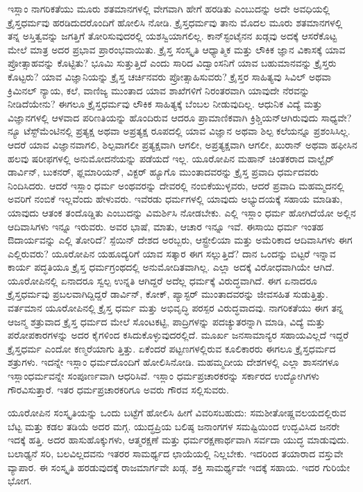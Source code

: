 ಇಸ್ಲಾಂ ನಾಗರಿಕತೆಯು ಮೂರು ಶತಮಾನಗಳಲ್ಲಿ ವೇಗವಾಗಿ ಹೇಗೆ ಹರಡಿತು ಎಂಬುದನ್ನು ಅದೇ ಅವಧಿಯಲ್ಲಿ ಕ್ರೈಸ್ತಧರ್ಮವು ಹರಡಿದುದರೊಂದಿಗೆ ಹೋಲಿಸಿ ನೋಡಿ. ಕ್ರೈಸ್ತಧರ್ಮವು ತಾನು ಮೊದಲ ಮೂರು ಶತಮಾನಗಳಲ್ಲಿ ತನ್ನ ಅಸ್ತಿತ್ವವನ್ನು ಜಗತ್ತಿಗೆ ತೋರಿಸುವುದರಲ್ಲಿ ಯಶಸ್ವಿಯಾಗಲಿಲ್ಲ. ಕಾನ್​ಸ್ಟಂಟೈನನ ಖಡ್ಗವು ಅದಕ್ಕೆ ಆಸರೆಕೊಟ್ಟ ಮೇಲೆ ಮಾತ್ರ ಅದರ ಪ್ರಭಾವ ಪ್ರಾರಂಭವಾಯಿತು. ಕ್ರೈಸ್ತ ಸಂಸ್ಕೃತಿ ಆಧ್ಯಾತ್ಮಿಕ ಮತ್ತು ಲೌಕಿಕ ಜ್ಞಾನ ವಿಕಾಸಕ್ಕೆ ಯಾವ ಪ್ರೋತ್ಸಾಹವನ್ನು ಕೊಟ್ಟಿತು? ಭೂಮಿ ಸುತ್ತುತ್ತಿದೆ ಎಂದು ಸಾರಿದ ವಿದ್ವಾಂಸನಿಗೆ ಯಾವ ಬಹುಮಾನವನ್ನು ಕ್ರೈಸ್ತರು ಕೊಟ್ಟರು? ಯಾವ ವಿಜ್ಞಾನಿಯನ್ನು ಕ್ರೈಸ್ತ ಚರ್ಚಿನವರು ಪ್ರೋತ್ಸಾಹಿಸುವರು? ಕ್ರೈಸ್ತರ ಸಾಹಿತ್ಯವು ಸಿವಿಲ್​ ಅಥವಾ ಕ್ರಿಮಿನಲ್​ ನ್ಯಾಯ, ಕಲೆ, ವಾಣಿಜ್ಯ ಮುಂತಾದ ಯಾವ ಶಾಖೆಗಳಿಗೆ ನಿರಂತರವಾಗಿ ಯಾವುದೇ ನೆರವನ್ನು ನೀಡಿದೆಯೇನು? ಈಗಲೂ ಕ್ರೈಸ್ತಧರ್ಮವು ಲೌಕಿಕ ಸಾಹಿತ್ಯಕ್ಕೆ ಬೆಂಬಲ ನೀಡುವುದಿಲ್ಲ. ಆಧುನಿಕ ವಿದ್ಯೆ ಮತ್ತು ವಿಜ್ಞಾನಗಳಲ್ಲಿ ಆಳವಾದ ಪರಿಣತಿಯನ್ನು ಹೊಂದಿರುವ ಆದರೂ ಪ್ರಾಮಾಣಿಕವಾಗಿ ಕ್ರಿಶ್ಚಿಯನ್​ ಆಗಿರುವುದು ಸಾಧ್ಯವೇ? ನ್ಯೂ ಟೆಸ್ಟ್​ಮೆಂಟಿನಲ್ಲಿ ಪ್ರತ್ಯಕ್ಷ ಅಥವಾ ಅಪ್ರತ್ಯಕ್ಷ ರೂಪದಲ್ಲಿ ಯಾವ ವಿಜ್ಞಾನ ಅಥವಾ ಶಿಲ್ಪ ಕಲೆಯನ್ನೂ ಪ್ರಶಂಸಿಸಿಲ್ಲ. ಆದರೆ ಯಾವ ವಿಜ್ಞಾನವಾಗಲಿ, ಶಿಲ್ಪವಾಗಲೀ ಪ್ರತ್ಯಕ್ಷವಾಗಿ ಆಗಲೀ, ಅಪ್ರತ್ಯಕ್ಷವಾಗಿ ಆಗಲೀ, ಖುರಾನ್​ ಅಥವಾ ಹಫೀಸಿನ ಹಲವು ಷರೀಫಗಳಲ್ಲಿ ಅನುಮೋದನೆಯನ್ನು ಪಡೆಯದೆ ಇಲ್ಲ. ಯೂರೋಪಿನ ಮಹಾನ್​ ಚಿಂತಕರಾದ ವಾಲ್ಟೈರ್​ ಡಾರ್ವಿನ್​, ಬುಕನರ್​, ಫ್ಲಮಾರಿಯನ್​, ವಿಕ್ಟರ್​ ಹ್ಯೂಗೊ ಮುಂತಾದವರನ್ನು ಕ್ರೈಸ್ತ ಪ್ರವಾದಿ ಧರ್ಮದವರು ನಿಂದಿಸಿದರು. ಆದರೆ ಇಸ್ಲಾಂ ಧರ್ಮ ಅಂಥವರನ್ನು ದೇವರಲ್ಲಿ ನಂಬಿಕೆಯುಳ್ಳವರು, ಆದರೆ ಪ್ರವಾದಿ ಮಹಮ್ಮದನಲ್ಲಿ ಅವರಿಗೆ ನಂಬಿಕೆ ಇಲ್ಲವೆಂದು ಹೇಳುವರು. ಇವೆರಡು ಧರ್ಮಗಳಲ್ಲಿ ಯಾವುದು ಅಭ್ಯುದಯಕ್ಕೆ ಸಹಾಯ ಮಾಡಿತು, ಯಾವುದು ಆತಂಕ ತಂದೊಡ್ಡಿತು ಎಂಬುದನ್ನು ವಿಮರ್ಶಿಸಿ ನೋಡಬೇಕು. ಎಲ್ಲಿ ಇಸ್ಲಾಂ ಧರ್ಮ ಹೋಗಿದೆಯೋ ಅಲ್ಲಿನ ಆದಿವಾಸಿಗಳು ಇನ್ನೂ ಇರುವರು. ಅವರ ಭಾಷೆ, ಮಾತು, ಆಚಾರ ಇನ್ನೂ ಇವೆ. ಈಸಾಯಿ ಧರ್ಮ ಇಂತಹ ಔದಾರ್ಯವನ್ನು ಎಲ್ಲಿ ತೋರಿದೆ? ಸ್ಪೆಯಿನ್​ ದೇಶದ ಅರಬ್ಬರು, ಆಸ್ಟ್ರೇಲಿಯಾ ಮತ್ತು ಅಮೆರಿಕಾದ ಆದಿವಾಸಿಗಳು ಈಗ ಎಲ್ಲಿರುವರು? ಯೂರೋಪಿನ ಯಹೂದ್ಯರಿಗೆ ಯಾವ ಸತ್ಕಾರ ಈಗ ಸಲ್ಲುತ್ತಿದೆ? ದಾನ ಒಂದನ್ನು ಬಿಟ್ಟರೆ ಇನ್ನಾವ ಕಾರ್ಯ ಪದ್ಧತಿಯೂ ಕ್ರೈಸ್ತ ಧರ್ಮಗ್ರಂಥದಲ್ಲಿ ಅನುಮೋದಿತವಾಗಿಲ್ಲ. ಎಲ್ಲಾ ಅದಕ್ಕೆ ವಿರೋಧವಾಗಿಯೇ ಆಗಿದೆ. ಯೂರೋಪಿನಲ್ಲಿ ಏನಾದರೂ ಸ್ವಲ್ಪ ಉನ್ನತಿ ಆಗಿದ್ದರೆ ಅದೆಲ್ಲ ಧರ್ಮಕ್ಕೆ ವಿರುದ್ಧವಾಗಿದೆ. ಈಗ ಏನಾದರೂ ಕ್ರೈಸ್ತಧರ್ಮವು ಪ್ರಬಲವಾಗಿದ್ದಿದ್ದರೆ ಡಾರ್ವಿನ್​, ಕೋಕ್​, ಪ್ಯಾಸ್ಟರ್​ ಮುಂತಾದವರನ್ನು ಜೀವಸಹಿತ ಸುಡುತ್ತಿತ್ತು. ವರ್ತಮಾನ ಯೂರೋಪಿನಲ್ಲಿ ಕ್ರೈಸ್ತ ಧರ್ಮ ಮತ್ತು ಅಭಿವೃದ್ಧಿ ಪರಸ್ಪರ ವಿರುದ್ಧವಾದವು. ನಾಗರಿಕತೆಯು ಈಗ ತನ್ನ ಆಜನ್ಮ ಶತ್ರುವಾದ ಕ್ರೈಸ್ತ ಧರ್ಮದ ಮೇಲೆ ಸೊಂಟಕಟ್ಟಿ, ಪಾದ್ರಿಗಳನ್ನು ಪದಚ್ಯುತರನ್ನಾಗಿ ಮಾಡಿ, ವಿದ್ಯೆ ಮತ್ತು ಪರೋಪಕಾರಗಳನ್ನು ಅದರ ಕೈಗಳಿಂದ ಕಸಿದುಕೊಳ್ಳುವುದರಲ್ಲಿದೆ. ಮೂರ್ಖ ಜನಸಾಮಾನ್ಯರ ಸಹಾಯವಿಲ್ಲದೆ ಇದ್ದರೆ ಕ್ರೈಸ್ತಧರ್ಮ ಎಂದೋ ಕಣ್ಮರೆಯಾಗು ತ್ತಿತ್ತು. ಏಕೆಂದರೆ ಪಟ್ಟಣಗಳಲ್ಲಿರುವ ಕೂಲಿಕಾರರು ಈಗಲೂ ಕ್ರೈಸ್ತಧರ್ಮದ ಶತ್ರುಗಳು. ಇದನ್ನೇ ಇಸ್ಲಾಂ ಧರ್ಮದೊಂದಿಗೆ ಹೋಲಿಸಿನೋಡಿ. ಮಹಮ್ಮದೀಯ ದೇಶಗಳಲ್ಲಿ ಎಲ್ಲಾ ಶಾಸನಗಳೂ ಇಸ್ಲಾಂಧರ್ಮವನ್ನೇ ಸಂಪೂರ್ಣವಾಗಿ ಆಧರಿಸಿವೆ. ಇಸ್ಲಾಂ ಧರ್ಮಪ್ರಚಾರಕರನ್ನು ಸರ್ಕಾರದ ಉದ್ಯೋಗಿಗಳು ಗೌರವಿಸುತ್ತಾರೆ. ಇತರ ಧರ್ಮಪ್ರಚಾರಕರಿಗೂ ಅವರು ಗೌರವ ಸಲ್ಲಿಸುವರು.

ಯೂರೋಪಿನ ಸಂಸ್ಕೃತಿಯನ್ನು ಒಂದು ಬಟ್ಟೆಗೆ ಹೋಲಿಸಿ ಹೀಗೆ ವಿವರಿಸಬಹುದು: ಸಮಶೀತೋಷ್ಣವಲಯದಲ್ಲಿರುವ ಬೆಟ್ಟ ಮತ್ತು ಕಡಲ ತಡಿಯೆ ಅದರ ಮಗ್ಗ. ಯುದ್ಧಪ್ರಿಯ ಬಲಿಷ್ಠ ಜನಾಂಗಗಳ ಸಮಷ್ಟಿಯಿಂದ ಉದ್ಭವಿಸಿದ ಜನರೇ ಇದಕ್ಕೆ ಹತ್ತಿ. ಅದರ ಹಾಸುಹೊಕ್ಕುಗಳು, ಆತ್ಮರಕ್ಷಣೆ ಮತ್ತು ಧರ್ಮರಕ್ಷಣಾರ್ಥವಾಗಿ ಸರ್ವದಾ ಯುದ್ಧ ಮಾಡುವುದು. ಬಲಾಢ್ಯನೆ ಸರಿ, ಬಲವಿಲ್ಲದವನು ಇತರರ ಸಾಮರ್ಥ್ಯದ ಛಾಯೆಯಲ್ಲಿ ನಿಲ್ಲಬೇಕು. ಇದರಿಂದ ತಯಾರಾದ ವಸ್ತುವೇ ವ್ಯಾಪಾರ. ಈ ಸಂಸ್ಕೃತಿ ಹರಡುವುದಕ್ಕೆ ರಾಜಮಾರ್ಗವೇ ಖಡ್ಗ. ಶಕ್ತಿ ಸಾಮರ್ಥ್ಯವೇ ಇದಕ್ಕೆ ಸಹಾಯ. ಇದರ ಗುರಿಯೇ ಭೋಗ.

